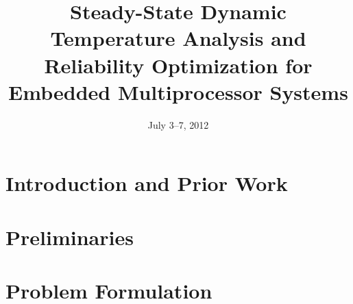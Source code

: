 \documentclass{sig-alternate}
\begin{document}

  \title{Steady-State Dynamic Temperature Analysis and Reliability Optimization for Embedded Multiprocessor Systems}

  \author{}

  \date{July 3--7, 2012}

  \maketitle

  \begin{abstract}
    
  \end{abstract}

  \section{Introduction and Prior Work}
  

  \section{Preliminaries} \label{sec:preliminaries}
  

  \section{Problem Formulation} \label{sec:problem}
  
\end{document}
